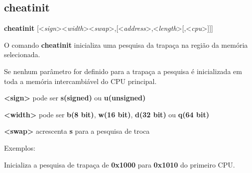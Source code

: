 \documentclass[letterpaper,10pt,brazil]{sphinxmanual}
\begin{document}
\subsection{cheatinit}
\label{debugger/cheats:cheatinit}\label{debugger/cheats:debugger-command-cheatinit}
\begin{DUlineblock}{0em}
\item[]
\begin{DUlineblock}{\DUlineblockindent}
\item[] \textbf{cheatinit} {[}\textless{}\emph{sign}\textgreater{}\textless{}\emph{width}\textgreater{}\textless{}\emph{swap}\textgreater{},{[}\textless{}\emph{address}\textgreater{},\textless{}\emph{length}\textgreater{}{[},\textless{}\emph{cpu}\textgreater{}{]}{]}{]}
\item[] 
\end{DUlineblock}
\item[] O comando \textbf{cheatinit} inicializa uma pesquisa da trapaça na região da memória selecionada.
\item[] 
\item[] Se nenhum parâmetro for definido para a trapaça a pesquisa é inicializada em toda a memória intercambiável do CPU principal.
\item[] 
\item[] \textbf{\textless{}sign\textgreater{}} pode ser \textbf{s(signed)} ou \textbf{u(unsigned)}
\item[] \textbf{\textless{}width\textgreater{}} pode ser \textbf{b(8 bit)}, \textbf{w(16 bit)}, \textbf{d(32 bit)} ou \textbf{q(64 bit)}
\item[] \textbf{\textless{}swap\textgreater{}} acrescenta \textbf{s} para a pesquisa de troca
\item[] 
\item[] Exemplos:
\item[] 
\item[]
\begin{DUlineblock}{\DUlineblockindent}
\item[] 
\item[] 
\end{DUlineblock}
\item[] Inicializa a pesquisa de trapaça de \textbf{0x1000} para \textbf{0x1010} do primeiro CPU.
\item[] 
\item[]
\begin{DUlineblock}{\DUlineblockindent}
\item[] 

\end{DUlineblock}
\end{DUlineblock}
\end{document}
